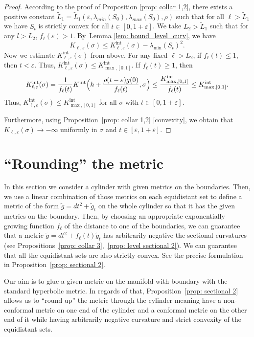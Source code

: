 \documentclass[10pt]{amsart}
\newcommand{\Int}{\mathrm{int}}
\theoremstyle{definition}
\let\eps\varepsilon
\renewcommand{\>}{{\rangle}}
\newcommand{\<}{{\langle}}
\begin{document}
\begin{proof}
According to the proof of Proposition \ref{prop: collar 1,2}, there exists a positive constant $\tilde L_1=\tilde L_1(\eps, \lambda_{min}(S_0), \lambda_{max}(S_0), \rho)$ such that for all $\ell>\tilde L_1$ we have $S_t$ is strictly convex for all $t\in[0,1+\eps]$. We take $L_2>\tilde L_1$ such that for any $l>L_2$, $f_{\ell}(\eps)>1$. By~Lemma \ref{lem: bound_level_curv}, we have
\[
K_{\ell,\eps}(\sigma)\leq K^{\Int}_{\ell,\eps}(\sigma)-\lambda_{\min}(S_t)^2.
\]
Now we estimate $K^{\Int}_{\ell,\eps}(\sigma)$ from above. For any fixed $\ell>L_2$, if $f_\ell(t)\leq 1$, then $t<\eps$. Thus, $K^{\Int}_{\ell,\eps}(\sigma)\leq K^{\Int}_{\max,[0,1]}$. If $f_\ell(t)\geq 1$, then
\[
K^{\Int}_{\ell,\eps}(\sigma)=\frac{1}{f_\ell(t)} K^{\Int}\Bigl(h+\frac{\rho(t-\eps)g(0)}{f_\ell(t)}, \sigma\Bigr)\leq \frac{K^{\Int}_{\max,[0,1]}}{f_\ell(t)}\leq K^{\Int}_{\max,[0,1]}.
\]
Thus, $K^{\Int}_{\ell,\eps}(\sigma)\leq K^{\Int}_{\max,[0,1]}$ for all $\sigma$ with $t\in[0,1+\eps]$.

Furthermore, using Proposition~\ref{prop: collar 1,2} \eqref{convexity}, we obtain that $K_{\ell,\eps}(\sigma)\to -\infty$ uniformly in $\sigma$ and $t\in[\eps,1+\eps]$.
\end{proof}

\section{``Rounding'' the metric}\label{construction 2}

In this section we consider a cylinder with given metrics on the boundaries. Then, we use a linear combination of those metrics on each equidistant set to define a metric of the form $\tilde g=dt^2+\tilde g_t$ on the whole cylinder so that it has the given metrics on the boundary. Then, by choosing an appropriate exponentially growing function $f_\ell$ of the distance to one of the boundaries, we can guarantee that a metric $\tilde g=dt^2+f_\ell(t)\tilde g_t$ has arbitrarily negative the sectional curvatures (see Propositions~\ref{prop: collar 3},~\ref{prop: level sectional 2}). We can guarantee that all the equidistant sets are also strictly convex. See the precise formulation in Proposition~\ref{prop: sectional 2}.

Our aim is to glue a given metric on the manifold with boundary with the standard hyperbolic metric. In regards of that, Proposition~\ref{prop: sectional 2} allows us to ``round up'' the metric through the cylinder meaning have a non-conformal metric on one end of the cylinder and a conformal metric on the other end of it while having arbitrarily negative curvature and strict convexity of the equidistant sets.
\end{document}
